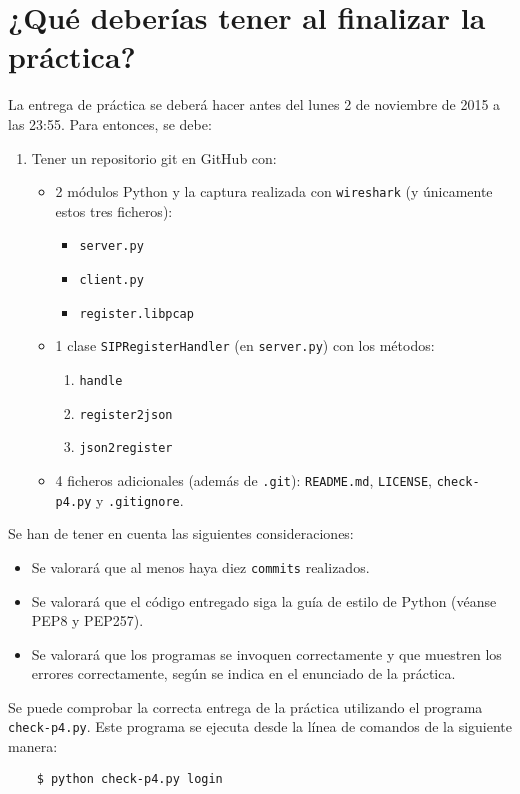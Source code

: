\documentclass[11pt,a4paper]{article}
\begin{document}
\section{¿Qué deberías tener al finalizar la práctica?}

La entrega de práctica se deberá hacer antes del lunes 2 de noviembre de 2015 a las 23:55. Para entonces, se debe: 

\begin{enumerate}
  \item Tener un repositorio git en GitHub con:
  \begin{itemize}
    \item 2 módulos Python y la captura realizada con \texttt{wireshark} (y únicamente estos tres ficheros):
    \begin{itemize}
      \item \texttt{server.py}
      \item \texttt{client.py}
      \item \texttt{register.libpcap}
    \end{itemize}
    \item 1 clase \texttt{SIPRegisterHandler} (en \texttt{server.py}) con los métodos:
    \begin{enumerate}
      \item \texttt{handle}
      \item \texttt{register2json}
      \item \texttt{json2register}
    \end{enumerate}
    \item 4 ficheros adicionales (además de \texttt{.git}): \texttt{README.md}, \texttt{LICENSE}, \texttt{check-p4.py} y \texttt{.gitignore}.
  \end{itemize}
\end{enumerate}

Se han de tener en cuenta las siguientes consideraciones:
\begin{itemize}
  \item Se valorará que al menos haya diez \texttt{commits} realizados.
  \item Se valorará que el código entregado siga la guía de estilo de Python (véanse PEP8 y PEP257).
  \item Se valorará que los programas se invoquen correctamente y que muestren los errores correctamente, según se indica en el enunciado de la práctica.
\end{itemize}

Se puede comprobar la correcta entrega de la práctica utilizando el programa \texttt{check-p4.py}. Este programa se ejecuta desde la línea de comandos de la siguiente manera:
\begin{verbatim}
	$ python check-p4.py login
\end{verbatim}
\end{document}

